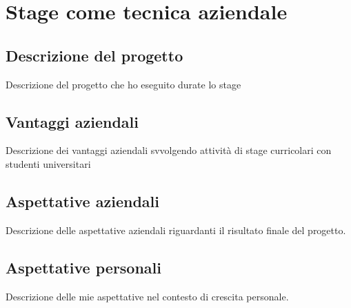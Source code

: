 
\chapter{Stage come tecnica aziendale}
\label{cap:tecnica-stage}

\section{Descrizione del progetto}
Descrizione del progetto che ho eseguito durate lo stage

\section{Vantaggi aziendali}

Descrizione dei vantaggi aziendali svvolgendo attività di stage curricolari con studenti universitari

\section{Aspettative aziendali}

Descrizione delle aspettative aziendali riguardanti il risultato finale del progetto.

\section{Aspettative personali}

Descrizione delle mie aspettative nel contesto di crescita personale.



